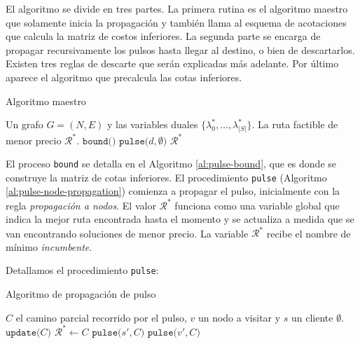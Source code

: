 El algoritmo se divide en tres partes. La primera rutina es el algoritmo maestro que solamente inicia la propagación y también llama al esquema de acotaciones que calcula la matriz de costos inferiores. La segunda parte se encarga de propagar recursivamente los pulsos hasta llegar al destino, o bien de descartarlos. Existen tres reglas de descarte que serán explicadas más adelante. Por último aparece el algoritmo que precalcula las cotas inferiores.

\begin{algorithm}[H]
  \caption{Algoritmo maestro}
  \label{al:pulse-master}
  \begin{algorithmic}[1]
  	\Require Un grafo $G = (N, E)$ y las variables duales $\{\lambda^*_0, \dots, \lambda^*_{|S|}\}$.
  	\Ensure La ruta factible de menor precio $\mathscr{R}^{*}$.
        \State $\texttt{bound()}$
        \State $\texttt{pulse(} d, \emptyset \texttt{)}$
	\Return $\mathscr{R}^{*}$
  \end{algorithmic}
\end{algorithm}

El proceso \texttt{bound} se detalla en el Algoritmo \ref{al:pulse-bound}, que es donde se construye la matriz de cotas inferiores. El procedimiento \texttt{pulse} (Algoritmo \ref{al:pulse-node-propagation}) comienza a propagar el pulso, inicialmente con la regla \emph{propagación a nodos}. El valor $\mathscr{R}^{*}$ funciona como una variable global que indica la mejor ruta encontrada hasta el momento y se actualiza a medida que se van encontrando soluciones de menor precio. La variable $\mathscr{R}^{*}$ recibe el nombre de mínimo \emph{incumbente}. 

Detallamos el procedimiento \texttt{pulse}:

\begin{algorithm}[H]
  \caption{Algoritmo de propagación de pulso}
  \label{al:pulse-node-propagation}
  \begin{algorithmic}[1]
  	\Require $C$ el camino parcial recorrido por el pulso, $v$ un nodo a visitar y $s$ un cliente
  	\Ensure $\emptyset$.
            \State $\texttt{update(} C \texttt{)}$
                \State $\mathscr{R}^{*} \gets C$
            \Else
                    \State $\texttt{pulse(} s', C\texttt{)}$
                \EndFor
                    \State $\texttt{pulse(}v', C \texttt{)}$
                \EndFor
            \EndIf
        \EndIf
  \end{algorithmic}
\end{algorithm}

